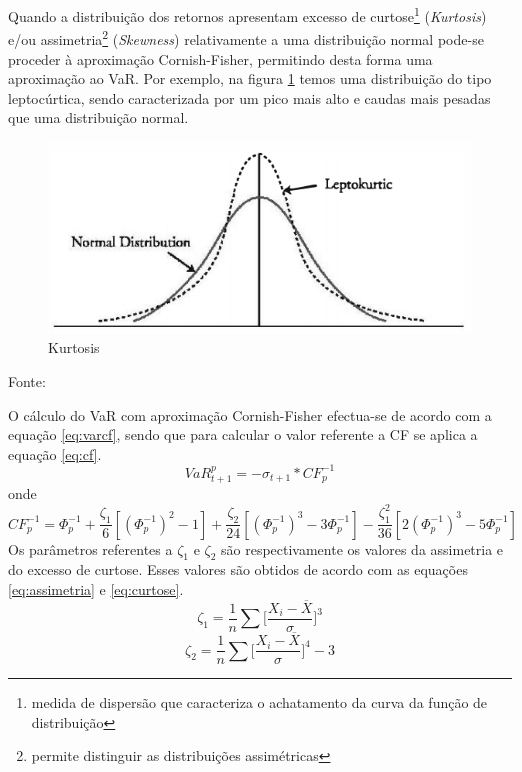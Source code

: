 \documentclass[
  12pt,
  a4paper,
  openany]{book}
\begin{document}
Quando a distribuição dos retornos apresentam excesso de curtose\footnote{medida de dispersão que caracteriza o achatamento da curva da função de distribuição} (\emph{Kurtosis}) e/ou assimetria\footnote{permite distinguir as distribuições assimétricas} (\emph{Skewness}) relativamente a uma distribuição normal pode-se proceder à aproximação Cornish-Fisher, permitindo desta forma uma aproximação ao VaR. Por exemplo, na figura \ref{fig:quant} temos uma distribuição do tipo leptocúrtica, sendo caracterizada por um pico mais alto e caudas mais pesadas que uma distribuição normal.
\bigskip

\begin{figure}

{\centering \includegraphics[width=0.6\linewidth]{image/kurtosis} 

}

\caption{Kurtosis}\label{fig:quant}
\end{figure}
\centering

Fonte: \citep[pp.46]{quant}

\justifying

O cálculo do VaR com aproximação Cornish-Fisher efectua-se de acordo com a equação \eqref{eq:varcf}, sendo que para calcular o valor referente a CF se aplica a equação \eqref{eq:cf}.
\begin{equation} 
  VaR_{t+1}^{p} = -\sigma_{t+1}*CF_{p}^{-1}
  \label{eq:varcf}
\end{equation}
onde
\begin{equation} 
  CF_{p}^{-1} = \Phi_{p}^{-1} + \frac{\zeta_{1}}{6}[(\Phi_{p}^{-1})^2-1] + \frac{\zeta_{2}}{24}[(\Phi_{p}^{-1})^3-3\Phi_{p}^{-1}] - \frac{\zeta_{1}^{2}}{36}[2(\Phi_{p}^{-1})^3-5\Phi_{p}^{-1}]
  \label{eq:cf}
\end{equation}
Os parâmetros referentes a \(\zeta_1\) e \(\zeta_2\) são respectivamente os valores da assimetria e do excesso de curtose. Esses valores são obtidos de acordo com as equações \eqref{eq:assimetria} e \eqref{eq:curtose}.
\begin{equation} 
 \zeta_1 = \frac{1}{n}\sum\bigg[\frac{X_i - \overline{X}}{\sigma}\bigg]^3
  \label{eq:assimetria}
\end{equation}
\begin{equation} 
 \zeta_2 = \frac{1}{n}\sum\bigg[\frac{X_i - \overline{X}}{\sigma}\bigg]^4 - 3
  \label{eq:curtose}
\end{equation}
\end{document}
